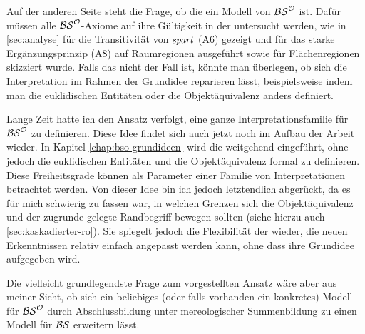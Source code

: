     
    Auf
    der anderen Seite steht die Frage, ob die \strukt ein Modell von $\mathcal{BS}^{\mathcal{O}}$ ist. Dafür müssen alle $\mathcal{BS}^{\mathcal{O}}$-Axiome auf ihre Gültigkeit in der \strukt untersucht werden, wie in \ref{sec:analyse} für die Transitivität von $\mathit{spart}$ (A6) gezeigt und für das starke Ergänzungsprinzip (A8) auf Raumregionen ausgeführt sowie für Flächenregionen skizziert wurde.
    Falls das nicht der Fall ist, könnte man überlegen, ob sich die Interpretation im Rahmen der Grundidee reparieren lässt, beispielsweise indem man die euklidischen Entitäten oder die Objektäquivalenz anders definiert.
    
    Lange Zeit
    hatte ich den Ansatz verfolgt, eine ganze Interpretationsfamilie für $\mathcal{BS}^{\mathcal{O}}$ zu definieren.
    Diese Idee findet sich auch jetzt noch im Aufbau der Arbeit wieder.
    In Kapitel \ref{chap:bso-grundideen} wird die \strukt weitgehend eingeführt, ohne jedoch die euklidischen Entitäten und die Objektäquivalenz formal zu definieren.
    Diese Freiheitsgrade können als Parameter einer Familie von Interpretationen betrachtet werden.
    Von dieser Idee bin ich jedoch letztendlich abgerückt, da es für mich schwierig zu fassen war, in welchen Grenzen sich die Objektäquivalenz und der zugrunde gelegte Randbegriff bewegen sollten (siehe hierzu auch \ref{sec:kaskadierter-ro}).
    Sie spiegelt jedoch die Flexibilität der \strukt wieder, die neuen Erkenntnissen relativ einfach angepasst werden kann, ohne dass ihre Grundidee aufgegeben wird.

    Die
    vielleicht grundlegendste Frage zum vorgestellten Ansatz wäre aber aus meiner Sicht,
    ob sich ein beliebiges (oder falls vorhanden ein konkretes) Modell für $\mathcal{BS}^{\mathcal{O}}$ durch Abschlussbildung unter mereologischer Summenbildung zu einen Modell für $\mathcal{BS}$ erweitern lässt.

